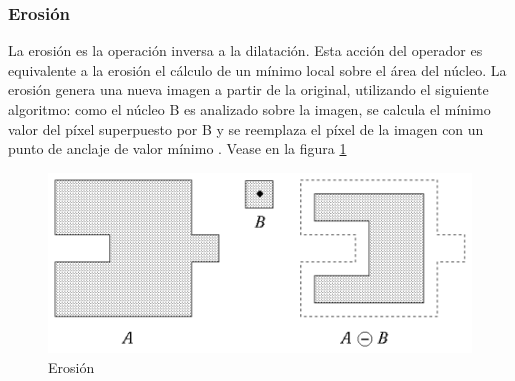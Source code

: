 \subsubsection{Erosión}
La erosión es la operación inversa a la dilatación. Esta acción del operador es equivalente a la erosión el cálculo de un mínimo local sobre el área del núcleo. La erosión genera una nueva imagen a partir de la original, utilizando el siguiente algoritmo: como el
núcleo B es analizado sobre la imagen, se calcula el mínimo valor del píxel superpuesto por B y se reemplaza el píxel de la imagen con un punto de anclaje de valor mínimo \cite{BookOpenCv}. 
Vease en la figura \ref{fig:erosion}

\begin{figure}[hbtp]
\centering
\includegraphics[scale=0.5]{imagenes/erosion.png}
\caption{Erosión}
\label{fig:erosion}
\end{figure}


